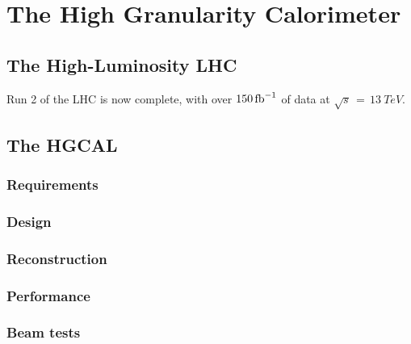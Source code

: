 \chapter{The High Granularity Calorimeter}
\label{chap:hgcal}

\section{The High-Luminosity LHC}

Run 2 of the LHC is now complete, with over $\SI{150}{\ensuremath{\textrm{fb}^{-1}}}$ of data at $\sqrt{s}\,=\,\SI{13}{TeV}$.

\section{The HGCAL}
\subsection{Requirements}
\subsection{Design}
\subsection{Reconstruction}
\subsection{Performance}
\subsection{Beam tests}
